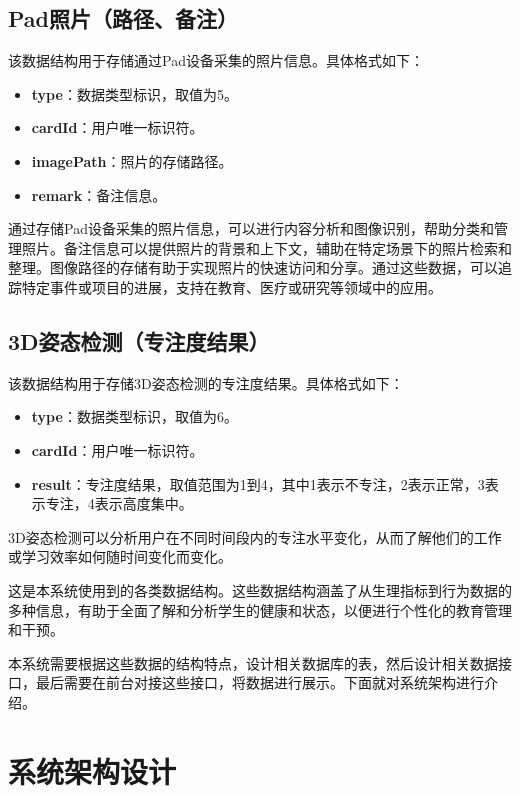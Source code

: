 \documentclass[oneside]{xduugthesis}
\begin{document}
\subsection{Pad照片（路径、备注）}
该数据结构用于存储通过Pad设备采集的照片信息。具体格式如下：

\begin{itemize}[nosep]
    \item \textbf{type}：数据类型标识，取值为5。
    \item \textbf{cardId}：用户唯一标识符。
    \item \textbf{imagePath}：照片的存储路径。
    \item \textbf{remark}：备注信息。
\end{itemize}

通过存储Pad设备采集的照片信息，可以进行内容分析和图像识别，帮助分类和管理照片。备注信息可以提供照片的背景和上下文，辅助在特定场景下的照片检索和整理。图像路径的存储有助于实现照片的快速访问和分享。通过这些数据，可以追踪特定事件或项目的进展，支持在教育、医疗或研究等领域中的应用。

\subsection{3D姿态检测（专注度结果）}
该数据结构用于存储3D姿态检测的专注度结果。具体格式如下：

\begin{itemize}[nosep]
    \item \textbf{type}：数据类型标识，取值为6。
    \item \textbf{cardId}：用户唯一标识符。
    \item \textbf{result}：专注度结果，取值范围为1到4，其中1表示不专注，2表示正常，3表示专注，4表示高度集中。
\end{itemize}

3D姿态检测可以分析用户在不同时间段内的专注水平变化，从而了解他们的工作或学习效率如何随时间变化而变化。

这是本系统使用到的各类数据结构。这些数据结构涵盖了从生理指标到行为数据的多种信息，有助于全面了解和分析学生的健康和状态，以便进行个性化的教育管理和干预。

本系统需要根据这些数据的结构特点，设计相关数据库的表，然后设计相关数据接口，最后需要在前台对接这些接口，将数据进行展示。下面就对系统架构进行介绍。

\section{系统架构设计}
\end{document}
